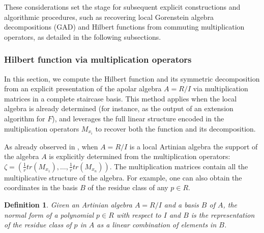 \documentclass[a4paper,11p]{amsart}
\newcommand{\m}{\mathfrak m}
\newtheorem{defn0}{Definition}[section]
\newenvironment{definition}{ \begin{defn0}}{\end{defn0}}
\newcommand{\K}{\mathbb K}
\begin{document}
These considerations set the stage for subsequent explicit constructions and algorithmic procedures, such as recovering local Gorenstein algebra decompositions (GAD) and Hilbert functions from commuting multiplication operators, as detailed in the following subsections.



\subsubsection{Hilbert function via multiplication operators}
In this section, we compute the Hilbert function and its symmetric decomposition from an explicit presentation of the apolar algebra $A=R/I$ via multiplication matrices in a complete staircase basis. This method applies when the local algebra is already determined (for instance, as the output of an extension algorithm for $F$), and leverages the full linear structure encoded in the multiplication operators $M_{x_i}$ to recover both the function and its decomposition.

As already observed in , when $A=R/I$ is a local Artinian algebra the support of the algebra $A$ is explicitly determined from the multiplication operators:
$\zeta=\left(\frac{1}{r}tr(M_{x_1}),\ldots,\frac{1}{r}tr(M_{x_n})\right).$
The multiplication matrices contain all the multiplicative structure of the algebra. For example, one can also  obtain the coordinates in the basis $B$ of the residue class of any $p\in R$.
\begin{definition}
Given an Artinian algebra $A=R/I$ and a basis $B$ of $A$, the \emph{normal form} of a polynomial $p\in R$ with respect to $I$ and $B$ is the representation of the residue class of $p$ in $A$ as a linear combination of elements in $B$.
\end{definition}
\end{document}

